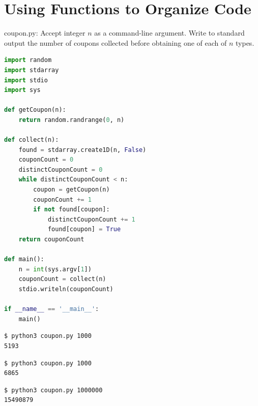 \documentclass[8pt,a4paper,compress]{beamer}
\begin{document}
\section{Using Functions to Organize Code}

\begin{frame}[fragile]
\pause

\begin{framed}
\tiny coupon.py: Accept integer $n$ as a command-line argument. Write to standard output the number of coupons collected before obtaining one of each of $n$ types.
\end{framed}

\begin{lstlisting}[language=Python,style=focusin]
import random
import stdarray
import stdio
import sys

def getCoupon(n):
    return random.randrange(0, n)

def collect(n):
    found = stdarray.create1D(n, False)
    couponCount = 0
    distinctCouponCount = 0
    while distinctCouponCount < n:
        coupon = getCoupon(n)
        couponCount += 1
        if not found[coupon]:
            distinctCouponCount += 1
            found[coupon] = True
    return couponCount

def main():
    n = int(sys.argv[1])
    couponCount = collect(n)
    stdio.writeln(couponCount)

if __name__ == '__main__':
    main()
\end{lstlisting}
\end{frame}

\begin{frame}[fragile]
\pause

\begin{lstlisting}[language={},style=focusin]
$ python3 coupon.py 1000
5193
\end{lstlisting}

\pause\smallskip

\begin{lstlisting}[language={},style=focusin]
$ python3 coupon.py 1000
6865
\end{lstlisting}

\pause\smallskip

\begin{lstlisting}[language={},style=focusin]
$ python3 coupon.py 1000000
15490879
\end{lstlisting}
\end{frame}
\end{document}
